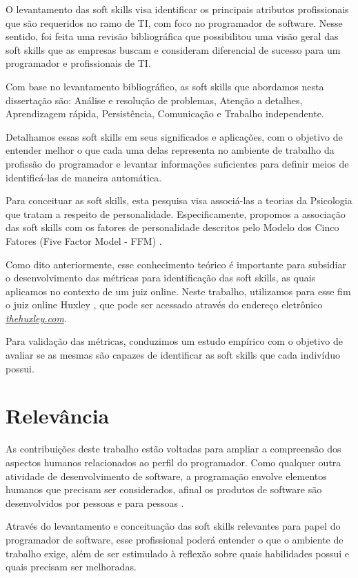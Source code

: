 O levantamento das soft skills visa identificar os principais atributos profissionais que são requeridos no ramo de TI, com foco no programador de software. Nesse sentido, foi feita uma revisão bibliográfica que possibilitou uma visão geral das soft skills que as empresas buscam e consideram diferencial de sucesso para um programador e profissionais de TI.

Com base no levantamento bibliográfico, as soft skills que abordamos nesta dissertação são: Análise e resolução de problemas, Atenção a detalhes, Aprendizagem rápida, Persistência, Comunicação e Trabalho independente. 

Detalhamos essas soft skills em seus significados e aplicações, com o objetivo de entender melhor o que cada uma delas representa no ambiente de trabalho da profissão do programador e levantar informações suficientes para definir meios de identificá-las de maneira automática.

Para conceituar as soft skills, esta pesquisa visa associá-las a teorias da Psicologia que tratam a respeito de personalidade. Especificamente, propomos a associação das soft skills com os fatores de personalidade descritos pelo Modelo dos Cinco Fatores (Five Factor Model - FFM) \cite{mccrae:92}. 

Como dito anteriormente, esse conhecimento teórico é importante para subsidiar o desenvolvimento das métricas para identificação das soft skills, as quais aplicamos no contexto de um juiz online. Neste trabalho, utilizamos para esse fim o juiz online Huxley \cite{paes:13}, que pode ser acessado através do endereço eletrônico \href{thehuxley.com}{\textsl{thehuxley.com}}.

Para validação das métricas, conduzimos um estudo empírico com o objetivo de avaliar se as mesmas são capazes de identificar as soft skills que cada indivíduo possui.

\section{Relevância}

As contribuições deste trabalho estão voltadas para ampliar a compreensão dos aspectos humanos relacionados ao perfil do programador. Como qualquer outra atividade de desenvolvimento de software, a programação envolve elementos humanos que precisam ser considerados, afinal os produtos de software são desenvolvidos por pessoas e para pessoas \cite{john:05}.

Através do levantamento e conceituação das soft skills relevantes para papel do programador de software, esse profissional poderá entender o que o ambiente de trabalho exige, além de ser estimulado à reflexão sobre quais habilidades possui e quais precisam ser melhoradas.

